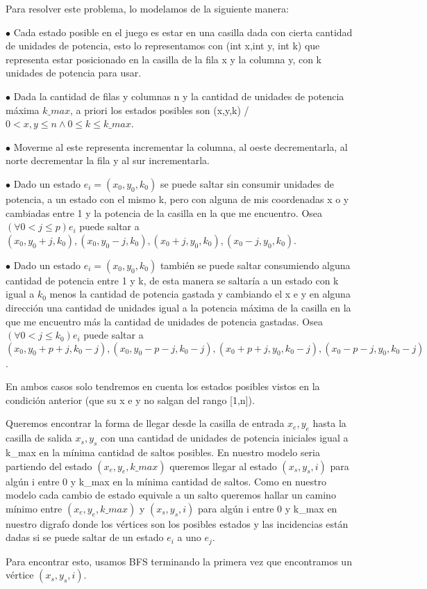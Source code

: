 Para resolver este problema, lo modelamos de la siguiente manera:

$\bullet$ Cada estado posible en el juego es estar en una casilla dada con cierta cantidad de unidades de potencia, esto lo representamos con (int x,int y, int k) que representa estar posicionado en la casilla de la fila x y la columna y, con k unidades de potencia para usar.

$\bullet$ Dada la cantidad de filas y columnas n y la cantidad de unidades de potencia máxima $k\_max$, a priori los estados posibles son (x,y,k) / $0 < x,y \leq n \wedge 0 \leq k \leq k\_max$. 

$\bullet$ Moverme al este representa incrementar la columna, al oeste decrementarla, al norte decrementar la fila y al sur incrementarla.

$\bullet$ Dado un estado $e_i = (x_0,y_0,k_0)$ se puede saltar sin consumir unidades de potencia, a un estado con el mismo k, pero con alguna de mis coordenadas x o y cambiadas entre 1 y la potencia de la casilla en la que me encuentro. Osea  $(\forall 0 < j \leq p ) e_i$ puede saltar a $(x_0,y_0+j,k_0), (x_0,y_0-j,k_0), (x_0+j,y_0,k_0), (x_0-j,y_0,k_0)$.

$\bullet$ Dado un estado $e_i = (x_0,y_0,k_0)$ también se puede saltar consumiendo alguna cantidad de potencia entre 1 y k, de esta manera se saltaría a un estado con k igual a $k_0$ menos la cantidad de potencia gastada y cambiando el x e y en alguna dirección una cantidad de unidades igual a la potencia máxima de la casilla en la que me encuentro más la cantidad de unidades de potencia gastadas. Osea $(\forall 0 < j \leq k_0 ) e_i$ puede saltar a $(x_0,y_0+p+j,k_0-j), (x_0,y_0-p-j,k_0-j), (x_0+p+j,y_0,k_0-j), (x_0-p-j,y_0,k_0-j)$. 

En ambos casos solo tendremos en cuenta los estados posibles vistos en la condición anterior (que su x e y no salgan del rango [1,n]).

Queremos encontrar la forma de llegar desde la casilla de entrada $x_e,y_e$ hasta la casilla de salida $x_s,y_s$ con una cantidad de unidades de potencia iniciales igual a k\_max en la mínima cantidad de saltos posibles. En nuestro modelo seria partiendo del estado $(x_e,y_e,k\_max)$ queremos llegar al estado $(x_s,y_s,i)$ para algún i entre 0 y k\_max en la mínima cantidad de saltos. Como en nuestro modelo cada cambio de estado equivale a un salto queremos hallar un camino mínimo entre $(x_e,y_e,k\_max)$ y $(x_s,y_s,i)$ para algún i entre 0 y k\_max en nuestro digrafo donde los vértices son los posibles estados y las incidencias están dadas si se puede saltar de un estado $e_i$ a uno $e_j$.

Para encontrar esto, usamos BFS terminando la primera vez que encontramos un vértice $(x_s,y_s,i)$.



